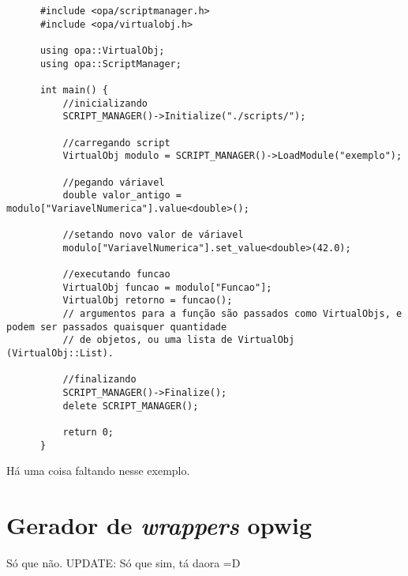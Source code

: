 \begin{enumerate}
    \begin{verbatim}
      #include <opa/scriptmanager.h>
      #include <opa/virtualobj.h>
      
      using opa::VirtualObj;
      using opa::ScriptManager;
      
      int main() {
          //inicializando
          SCRIPT_MANAGER()->Initialize("./scripts/");
          
          //carregando script
          VirtualObj modulo = SCRIPT_MANAGER()->LoadModule("exemplo");
          
          //pegando váriavel
          double valor_antigo = modulo["VariavelNumerica"].value<double>();
          
          //setando novo valor de váriavel
          modulo["VariavelNumerica"].set_value<double>(42.0);
          
          //executando funcao
          VirtualObj funcao = modulo["Funcao"];
          VirtualObj retorno = funcao(); 
          // argumentos para a função são passados como VirtualObjs, e podem ser passados quaisquer quantidade
          // de objetos, ou uma lista de VirtualObj (VirtualObj::List).
          
          //finalizando
          SCRIPT_MANAGER()->Finalize();
          delete SCRIPT_MANAGER();
          
          return 0;
      }
    \end{verbatim}
    
    Há uma coisa faltando nesse exemplo. 
  
\end{enumerate}


\section{Gerador de \emph{wrappers} \textbf{opwig}}

Só que não. 
UPDATE: Só que sim, tá daora =D
